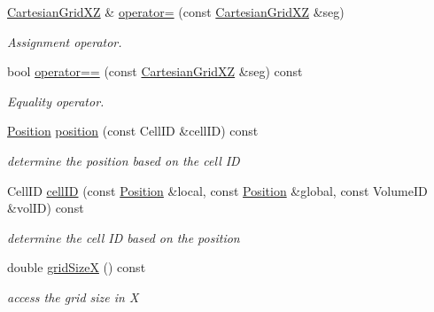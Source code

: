 \begin{DoxyCompactItemize}
\hyperlink{class_d_d4hep_1_1_geometry_1_1_cartesian_grid_x_z}{CartesianGridXZ} \& \hyperlink{class_d_d4hep_1_1_geometry_1_1_cartesian_grid_x_z_a07eeb7b46619fe93bf00acafb09989d0}{operator=} (const \hyperlink{class_d_d4hep_1_1_geometry_1_1_cartesian_grid_x_z}{CartesianGridXZ} \&seg)
\begin{DoxyCompactList}\small\item\em Assignment operator. \item\end{DoxyCompactList}\item 
bool \hyperlink{class_d_d4hep_1_1_geometry_1_1_cartesian_grid_x_z_a6ebac42f6146d34bc9e83729e4bf279b}{operator==} (const \hyperlink{class_d_d4hep_1_1_geometry_1_1_cartesian_grid_x_z}{CartesianGridXZ} \&seg) const 
\begin{DoxyCompactList}\small\item\em Equality operator. \item\end{DoxyCompactList}\item 
\hyperlink{namespace_d_d4hep_1_1_geometry_a55083902099d03506c6db01b80404900}{Position} \hyperlink{class_d_d4hep_1_1_geometry_1_1_cartesian_grid_x_z_a6203b834d764c9d769f407566cff4a75}{position} (const CellID \&cellID) const 
\begin{DoxyCompactList}\small\item\em determine the position based on the cell ID \item\end{DoxyCompactList}\item 
CellID \hyperlink{class_d_d4hep_1_1_geometry_1_1_cartesian_grid_x_z_a33d11d661bea782691e6e862922e5332}{cellID} (const \hyperlink{namespace_d_d4hep_1_1_geometry_a55083902099d03506c6db01b80404900}{Position} \&local, const \hyperlink{namespace_d_d4hep_1_1_geometry_a55083902099d03506c6db01b80404900}{Position} \&global, const VolumeID \&volID) const 
\begin{DoxyCompactList}\small\item\em determine the cell ID based on the position \item\end{DoxyCompactList}\item 
double \hyperlink{class_d_d4hep_1_1_geometry_1_1_cartesian_grid_x_z_adb5f3bad513ff48725d07c8ff202b750}{gridSizeX} () const 
\begin{DoxyCompactList}\small\item\em access the grid size in X \item\end{DoxyCompactList}\item 

\end{DoxyCompactItemize}
